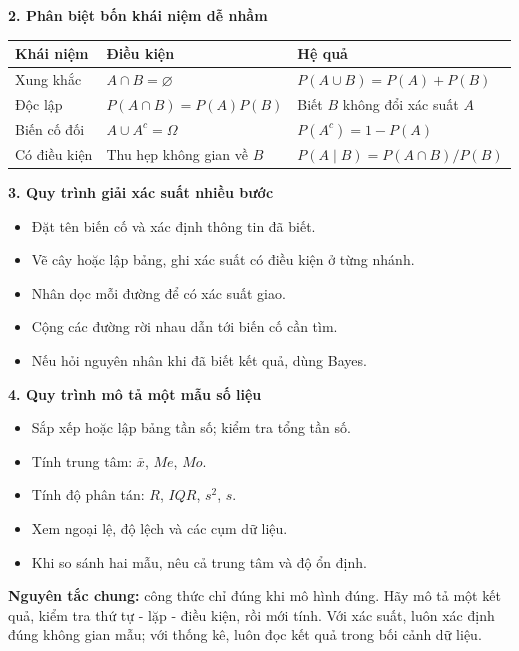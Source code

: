\documentclass[12pt,a4paper]{article}
\newenvironment{keypoints}{%
  \begin{itemize}[leftmargin=6mm,itemsep=2pt,topsep=3pt]
}{\end{itemize}}
\begin{document}
\textbf{2. Phân biệt bốn khái niệm dễ nhầm}
\begin{center}
\begin{tabularx}{\textwidth}{p{3cm}p{6cm}X}
\toprule
\textbf{Khái niệm} & \textbf{Điều kiện} & \textbf{Hệ quả} \\
\midrule
Xung khắc & $A\cap B=\varnothing$ & $P(A\cup B)=P(A)+P(B)$ \\
Độc lập & $P(A\cap B)=P(A)P(B)$ & Biết $B$ không đổi xác suất $A$ \\
Biến cố đối & $A\cup A^c=\Omega$ & $P(A^c)=1-P(A)$ \\
Có điều kiện & Thu hẹp không gian về $B$ & $P(A\mid B)=P(A\cap B)/P(B)$ \\
\bottomrule
\end{tabularx}
\end{center}

\textbf{3. Quy trình giải xác suất nhiều bước}
\begin{keypoints}
  \item Đặt tên biến cố và xác định thông tin đã biết.
  \item Vẽ cây hoặc lập bảng, ghi xác suất có điều kiện ở từng nhánh.
  \item Nhân dọc mỗi đường để có xác suất giao.
  \item Cộng các đường rời nhau dẫn tới biến cố cần tìm.
  \item Nếu hỏi nguyên nhân khi đã biết kết quả, dùng Bayes.
\end{keypoints}

\textbf{4. Quy trình mô tả một mẫu số liệu}
\begin{keypoints}
  \item Sắp xếp hoặc lập bảng tần số; kiểm tra tổng tần số.
  \item Tính trung tâm: $\bar{x}$, $Me$, $Mo$.
  \item Tính độ phân tán: $R$, $IQR$, $s^2$, $s$.
  \item Xem ngoại lệ, độ lệch và các cụm dữ liệu.
  \item Khi so sánh hai mẫu, nêu cả trung tâm và độ ổn định.
\end{keypoints}

\begin{leadbox}
\textbf{Nguyên tắc chung:} công thức chỉ đúng khi mô hình đúng. Hãy mô tả một
kết quả, kiểm tra thứ tự - lặp - điều kiện, rồi mới tính. Với xác suất, luôn xác
định đúng không gian mẫu; với thống kê, luôn đọc kết quả trong bối cảnh dữ liệu.
\end{leadbox}
\end{document}
